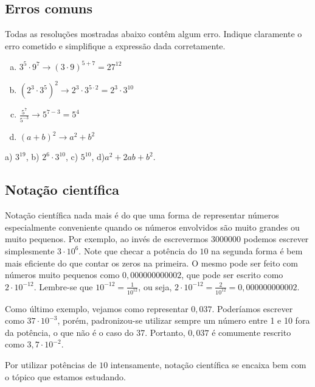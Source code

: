 \documentclass[main.tex]{subfiles}
\begin{document}
\subsection*{Erros comuns}

\begin{questao}
Todas as resoluções mostradas abaixo contêm algum erro. Indique claramente o erro cometido e simplifique a expressão dada corretamente.
\begin{enumerate}[a)]
\item $3^5 \cdot 9^7  \longrightarrow (3 \cdot 9)^{5+7} = 27^{12}$
\item $(2^3 \cdot 3^5)^2  \longrightarrow 2^3 \cdot 3^{5 \cdot 2} = 2^3 \cdot 3^{10}$
\item $\frac{5^7}{5^{-3}}  \longrightarrow 5^{7-3}=5^4$
\item $(a+b)^2 \longrightarrow a^2+b^2$
\end{enumerate}
\end{questao}

\begin{gabarito}
	\begin{gabaritoQuestao}
		a) $3^{19}$, b) $2^6 \cdot 3^{10}$, c) $5^{10}$, d)$a^2+2ab+b^2$.
	\end{gabaritoQuestao}
\end{gabarito}

\subsection*{Notação científica}

Notação científica nada mais é do que uma forma de representar números especialmente conveniente quando os números envolvidos são muito grandes ou muito pequenos. Por exemplo, ao invés de escrevermos $3000000$ podemos escrever simplesmente $3 \cdot 10^6$. Note que checar a potência do $10$ na segunda forma é bem mais eficiente do que contar os zeros na primeira. O mesmo pode ser feito com números muito pequenos como $0,000000000002$, que pode ser escrito como $2 \cdot 10^{-12}$. Lembre-se que $10^{-12} = \frac{1}{10^12}$, ou seja, $2 \cdot 10^{-12} = \frac{2}{10^12} = 0,000000000002$.

Como último exemplo, vejamos como representar $0,037$. Poderíamos escrever como $37 \cdot 10^{-3}$, porém, padronizou-se utilizar sempre um número entre 1 e 10 fora da potência, o que não é o caso do 37. Portanto, $0,037$ é comumente rescrito como $3,7 \cdot 10^{-2}$.

Por utilizar potências de $10$ intensamente, notação científica se encaixa bem com o tópico que estamos estudando.
\end{document}
